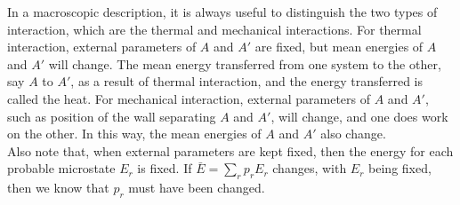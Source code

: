 \documentclass[11pt]{article}
\theoremstyle{break}
\theoremstyle{break}
\begin{document}
In a macroscopic description, it is always useful to distinguish the two types of interaction, which are the thermal and mechanical interactions. For thermal interaction, external parameters of $A$ and $A'$ are fixed, but mean energies of $A$ and $A'$ will change. The mean energy transferred from one system to the other, say $A$ to $A'$, as a result of thermal interaction, and the energy transferred is called the heat. For mechanical interaction, external parameters of $A$ and $A'$, such as position of the wall separating $A$ and $A'$, will change, and one does work on the other. In this way, the mean energies of $A$ and $A'$ also change. \\

Also note that, when external parameters are kept fixed, then the energy for each probable microstate $E_r$ is fixed. If $\bar{E} = \sum_r p_r E_r$ changes, with $E_r$ being fixed, then we know that $p_r$ must have been changed.   \\
\end{document}

